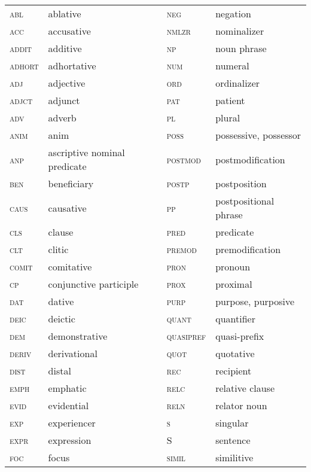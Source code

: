  \begin{table}
 	\centering
 		\begin{tabular}{ll|ll}
 \textsc{abl} 	& ablative & \textsc{neg} 	& negation \\
 \textsc{acc} 	& accusative & \textsc{nmlzr} 	& nominalizer \\
 \textsc{addit} 	& additive & \textsc{np} 	& noun phrase \\
 \textsc{adhort} & adhortative & \textsc{num} 	& numeral \\
 \textsc{adj} 	& adjective & \textsc{ord} 	& ordinalizer \\
 \textsc{adjct} 	& adjunct & \textsc{pat} 	& patient \\
 \textsc{adv} 	& adverb & \textsc{pl} 	& plural \\
 \textsc{anim} 	& anim & \textsc{poss} 	& possessive, possessor \\
 \textsc{anp} 		& ascriptive nominal predicate & \textsc{postmod} & postmodification \\
 \textsc{ben} 	& beneficiary & \textsc{postp} 	& postposition \\
 \textsc{caus} 	& causative & \textsc{pp} 	& postpositional phrase \\
 \textsc{cls} 	& clause & \textsc{pred} 	& predicate \\
 \textsc{clt} 	& clitic & \textsc{premod} 	& premodification \\
 \textsc{comit} 	& comitative & \textsc{pron} 	& pronoun \\
 \textsc{cp} 	& conjunctive participle & \textsc{prox} 	& proximal \\
 \textsc{dat} 	& dative & \textsc{purp} 	& purpose, purposive \\
 \textsc{deic} 	& deictic & \textsc{quant} 	& quantifier \\
 \textsc{dem} 	& demonstrative & \textsc{quasipref}& quasi-prefix \\
 \textsc{deriv} 	& derivational & \textsc{quot} 	& quotative \\
 \textsc{dist} 	& distal & \textsc{rec} 	& recipient \\
 \textsc{emph} 	& emphatic & \textsc{relc} 	& relative clause \\
 \textsc{evid} 	& evidential & \textsc{reln} 	& relator noun \\
 \textsc{exp} 	& experiencer & \textsc{s} 	& singular \\
 \textsc{expr} 	& expression & S 	& sentence \\
 \textsc{foc} 	& focus & \textsc{simil} 	& similitive \\

\end{tabular}
\end{table}
